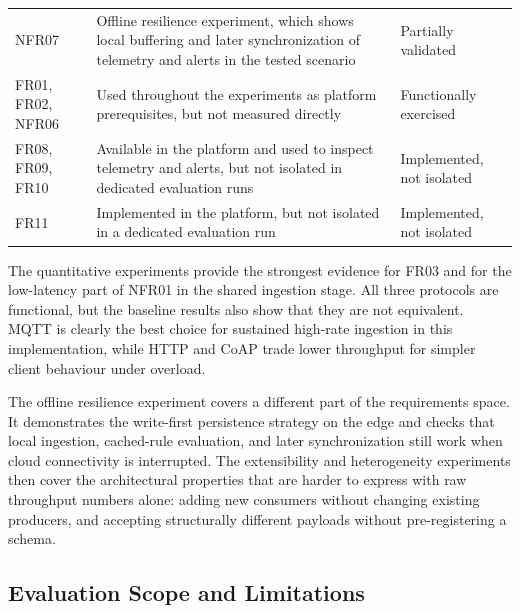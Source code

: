 \begin{table}[htbp]
\begin{tabular}{p{3.0cm} p{6.6cm} p{2.6cm}}
        NFR07                      & Offline resilience experiment, which shows local buffering and later synchronization of telemetry and alerts in the tested scenario                     & Partially validated          \\
        FR01, FR02, NFR06          & Used throughout the experiments as platform prerequisites, but not measured directly                                                                    & Functionally exercised       \\
        FR08, FR09, FR10           & Available in the platform and used to inspect telemetry and alerts, but not isolated in dedicated evaluation runs                                       & Implemented, not isolated    \\
        FR11                       & Implemented in the platform, but not isolated in a dedicated evaluation run                                                                             & Implemented, not isolated    \\
        \bottomrule
    \end{tabular}
\end{table}

The quantitative experiments provide the strongest evidence for FR03 and for the low-latency part of NFR01 in the shared ingestion stage. All three protocols are functional, but the baseline results also show that they are not equivalent. \gls{MQTT} is clearly the best choice for sustained high-rate ingestion in this implementation, while \gls{HTTP} and \gls{CoAP} trade lower throughput for simpler client behaviour under overload.

The offline resilience experiment covers a different part of the requirements space. It demonstrates the write-first persistence strategy on the edge and checks that local ingestion, cached-rule evaluation, and later synchronization still work when cloud connectivity is interrupted. The extensibility and heterogeneity experiments then cover the architectural properties that are harder to express with raw throughput numbers alone: adding new consumers without changing existing producers, and accepting structurally different payloads without pre-registering a schema.

\subsection{Evaluation Scope and Limitations}
\label{subsec:EvalThreats}

